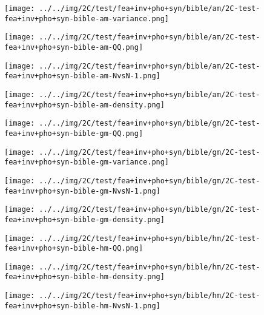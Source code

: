 \begin{figure}[H]
\centering	\texttt{[image: ../../img/2C/test/fea+inv+pho+syn/bible/am/2C-test-fea+inv+pho+syn-bible-am-variance.png]}
\end{figure}
\begin{figure}[H]
\centering	\texttt{[image: ../../img/2C/test/fea+inv+pho+syn/bible/am/2C-test-fea+inv+pho+syn-bible-am-QQ.png]}
\end{figure}
\begin{figure}[H]
\centering	\texttt{[image: ../../img/2C/test/fea+inv+pho+syn/bible/am/2C-test-fea+inv+pho+syn-bible-am-NvsN-1.png]}
\end{figure}
\begin{figure}[H]
\centering	\texttt{[image: ../../img/2C/test/fea+inv+pho+syn/bible/am/2C-test-fea+inv+pho+syn-bible-am-density.png]}
\end{figure}
\begin{figure}[H]
\centering	\texttt{[image: ../../img/2C/test/fea+inv+pho+syn/bible/gm/2C-test-fea+inv+pho+syn-bible-gm-QQ.png]}
\end{figure}
\begin{figure}[H]
\centering	\texttt{[image: ../../img/2C/test/fea+inv+pho+syn/bible/gm/2C-test-fea+inv+pho+syn-bible-gm-variance.png]}
\end{figure}
\begin{figure}[H]
\centering	\texttt{[image: ../../img/2C/test/fea+inv+pho+syn/bible/gm/2C-test-fea+inv+pho+syn-bible-gm-NvsN-1.png]}
\end{figure}
\begin{figure}[H]
\centering	\texttt{[image: ../../img/2C/test/fea+inv+pho+syn/bible/gm/2C-test-fea+inv+pho+syn-bible-gm-density.png]}
\end{figure}
\begin{figure}[H]
\centering	\texttt{[image: ../../img/2C/test/fea+inv+pho+syn/bible/hm/2C-test-fea+inv+pho+syn-bible-hm-QQ.png]}
\end{figure}
\begin{figure}[H]
\centering	\texttt{[image: ../../img/2C/test/fea+inv+pho+syn/bible/hm/2C-test-fea+inv+pho+syn-bible-hm-density.png]}
\end{figure}
\begin{figure}[H]
\centering	\texttt{[image: ../../img/2C/test/fea+inv+pho+syn/bible/hm/2C-test-fea+inv+pho+syn-bible-hm-NvsN-1.png]}
\end{figure}
